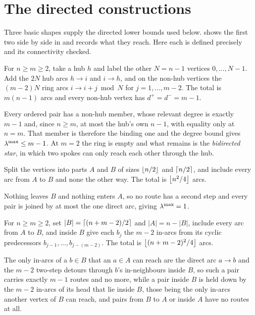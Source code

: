 \section{The directed constructions}\label{sec:dir-constructions}

Three basic shapes supply the directed lower bounds used below.  shows the first two side by side in  and records what they reach. Here each is defined precisely and its connectivity checked.

\begin{construction}\label{const:directed-hub}
For $n \ge m \ge 2$, take a hub $h$ and label the other $N = n-1$ vertices $0, \dots, N-1$. Add the $2N$ hub arcs $h \to i$ and $i \to h$, and on the non-hub vertices the $(m-2)N$ ring arcs $i \to i+j \bmod N$ for $j = 1, \dots, m-2$. The total is $m(n-1)$ arcs and every non-hub vertex has $d^+ = d^- = m-1$.
\end{construction}

Every ordered pair has a non-hub member, whose relevant degree is exactly $m-1$ and, since $n \ge m$, at most the hub's own $n-1$, with equality only at $n = m$. That member is therefore the binding one and the degree bound gives $\lambda^{\max} \le m-1$. At $m = 2$ the ring is empty and what remains is the \emph{bidirected star}, in which two spokes can only reach each other through the hub.

\begin{construction}\label{const:bipartite}
Split the vertices into parts $A$ and $B$ of sizes $\left\lfloor n/2 \right\rfloor$ and $\left\lceil n/2 \right\rceil$, and include every arc from $A$ to $B$ and none the other way. The total is $\left\lfloor n^2/4 \right\rfloor$ arcs.
\end{construction}

Nothing leaves $B$ and nothing enters $A$, so no route has a second step and every pair is joined by at most the one direct arc, giving $\lambda^{\max} = 1$.

\begin{construction}\label{const:augmented-bipartite}
For $n \ge m \ge 2$, set $|B| = \left\lceil (n+m-2)/2 \right\rceil$ and $|A| = n - |B|$, include every arc from $A$ to $B$, and inside $B$ give each $b_j$ the $m-2$ in-arcs from its cyclic predecessors $b_{j-1}, \dots, b_{j-(m-2)}$. The total is $\left\lfloor (n+m-2)^2/4 \right\rfloor$ arcs.
\end{construction}

The only in-arcs of a $b \in B$ that an $a \in A$ can reach are the direct arc $a \to b$ and the $m-2$ two-step detours through $b$'s in-neighbours inside $B$, so such a pair carries exactly $m-1$ routes and no more, while a pair inside $B$ is held down by the $m-2$ in-arcs of its head that lie inside $B$, those being the only in-arcs another vertex of $B$ can reach, and pairs from $B$ to $A$ or inside $A$ have no routes at all.

